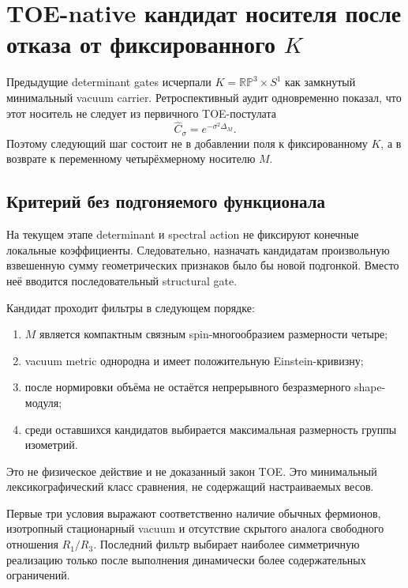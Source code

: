 \chapter{TOE-native кандидат носителя после отказа от фиксированного \texorpdfstring{\(K\)}{K}}

Предыдущие determinant gates исчерпали
\(K=\mathbb{RP}^3\times S^1\) как замкнутый минимальный vacuum carrier.
Ретроспективный аудит одновременно показал, что этот носитель не следует из
первичного TOE-постулата
\begin{equation}
 \widehat C_\sigma=e^{-\sigma^2\Delta_M}.
\end{equation}
Поэтому следующий шаг состоит не в добавлении поля к фиксированному \(K\),
а в возврате к переменному четырёхмерному носителю \(M\).

\section{Критерий без подгоняемого функционала}

На текущем этапе determinant и spectral action не фиксируют конечные
локальные коэффициенты. Следовательно, назначать кандидатам произвольную
взвешенную сумму геометрических признаков было бы новой подгонкой. Вместо
неё вводится последовательный structural gate.

\begin{protocol}
Кандидат проходит фильтры в следующем порядке:
\begin{enumerate}
 \item \(M\) является компактным связным spin-многообразием размерности
 четыре;
 \item vacuum metric однородна и имеет положительную Einstein-кривизну;
 \item после нормировки объёма не остаётся непрерывного безразмерного
 shape-модуля;
 \item среди оставшихся кандидатов выбирается максимальная размерность
 группы изометрий.
\end{enumerate}
Это не физическое действие и не доказанный закон TOE. Это минимальный
лексикографический класс сравнения, не содержащий настраиваемых весов.
\end{protocol}

Первые три условия выражают соответственно наличие обычных фермионов,
изотропный стационарный vacuum и отсутствие скрытого аналога свободного
отношения \(R_1/R_3\). Последний фильтр выбирает наиболее симметричную
реализацию только после выполнения динамически более содержательных
ограничений.

